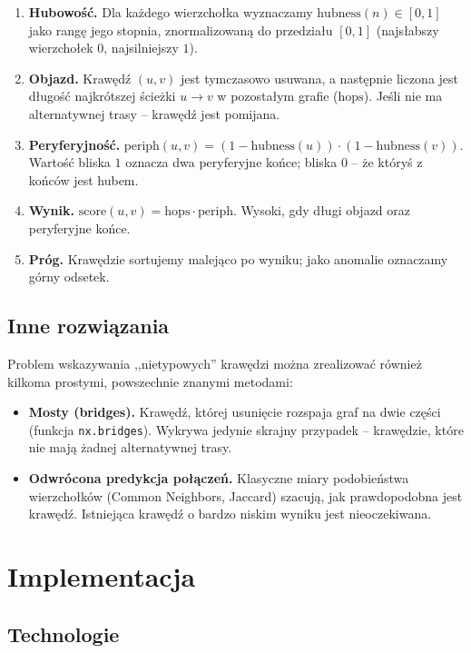 \documentclass[12pt]{article}
\begin{document}
\begin{enumerate}
    \item \textbf{Hubowość.} Dla każdego wierzchołka wyznaczamy $\mathrm{hubness}(n) \in [0,1]$ jako rangę jego stopnia, znormalizowaną do przedziału $[0,1]$ (najsłabszy wierzchołek $0$, najsilniejszy $1$).
    \item \textbf{Objazd.} Krawędź $(u,v)$ jest tymczasowo usuwana, a następnie liczona jest długość najkrótszej ścieżki $u \rightarrow v$ w pozostałym grafie ($\mathrm{hops}$). Jeśli nie ma alternatywnej trasy -- krawędź jest pomijana.
    \item \textbf{Peryferyjność.} $\mathrm{periph}(u,v) = (1 - \mathrm{hubness}(u)) \cdot (1 - \mathrm{hubness}(v))$. Wartość bliska $1$ oznacza dwa peryferyjne końce; bliska $0$ -- że któryś z końców jest hubem.
    \item \textbf{Wynik.} $\mathrm{score}(u,v) = \mathrm{hops} \cdot \mathrm{periph}$. Wysoki, gdy długi objazd oraz peryferyjne końce.
    \item \textbf{Próg.} Krawędzie sortujemy malejąco po wyniku; jako anomalie oznaczamy górny odsetek.
\end{enumerate}

\subsection{Inne rozwiązania}

Problem wskazywania ,,nietypowych'' krawędzi można zrealizować również kilkoma prostymi, powszechnie znanymi metodami:

\begin{itemize}
    \item \textbf{Mosty (bridges).} Krawędź, której usunięcie rozspaja graf na dwie części (funkcja \texttt{nx.bridges}). Wykrywa jedynie skrajny przypadek -- krawędzie, które nie mają żadnej alternatywnej trasy.
    \item \textbf{Odwrócona predykcja połączeń.} Klasyczne miary podobieństwa wierzchołków (Common Neighbors, Jaccard) szacują, jak prawdopodobna jest krawędź. Istniejąca krawędź o bardzo niskim wyniku jest nieoczekiwana.
\end{itemize}

\section{Implementacja}

\subsection{Technologie}
\end{document}
